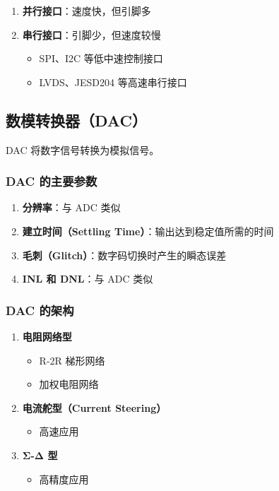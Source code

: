 \begin{enumerate}
  \item \textbf{并行接口}：速度快，但引脚多
  \item \textbf{串行接口}：引脚少，但速度较慢
    \begin{itemize}
      \item SPI、I2C 等低中速控制接口
      \item LVDS、JESD204 等高速串行接口
    \end{itemize}
\end{enumerate}

\subsection{数模转换器（DAC）}

DAC 将数字信号转换为模拟信号。

\subsubsection{DAC 的主要参数}

\begin{enumerate}
  \item \textbf{分辨率}：与 ADC 类似
  \item \textbf{建立时间（Settling Time）}：输出达到稳定值所需的时间
  \item \textbf{毛刺（Glitch）}：数字码切换时产生的瞬态误差
  \item \textbf{INL 和 DNL}：与 ADC 类似
\end{enumerate}

\subsubsection{DAC 的架构}

\begin{enumerate}
  \item \textbf{电阻网络型}
    \begin{itemize}
      \item R-2R 梯形网络
      \item 加权电阻网络
    \end{itemize}

  \item \textbf{电流舵型（Current Steering）}
    \begin{itemize}
      \item 高速应用
    \end{itemize}

  \item \textbf{Σ-Δ 型}
    \begin{itemize}
      \item 高精度应用
    \end{itemize}
\end{enumerate}

